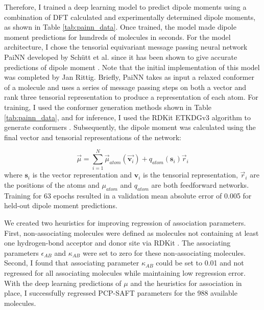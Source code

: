 Therefore, I trained a deep learning model to predict dipole moments using a combination of DFT calculated and experimentally determined dipole moments, as shown in Table \ref{tab:painn_data}.  Once trained, the model made dipole moment predictions for hundreds of molecules in seconds. For the model architecture, I chose the tensorial equivariant message passing neural network PaiNN developed by Schütt et al. since it has been shown to give accurate predictions of dipole moment \cite{Schutt2021}. Note that the initial implementation of this model was completed by Jan Rittig. Briefly, PaiNN takes as input a relaxed conformer of a molecule and uses a series of message passing steps on both a vector and rank three tensorial representation to produce a representation of each atom. For training, I used the conformer generation methods shown in Table \ref{tab:painn_data}, and for inference, I used the RDKit ETKDGv3 algorithm to generate conformers \cite{Wang2020}. Subsequently, the dipole moment was calculated using the final vector and tensorial representations of the network:

\begin{equation}
    \vec \mu = \sum_{i=1}^N \vec \mu_{atom}(\vec{\mathbf v_i}) + q_{atom}(\mathbf s_i)\vec r_i
\end{equation}
where $\mathbf s_i$ is the vector representation and $\mathbf v_i$ is the tensorial representation, $\vec r_i$ are the positions of the atoms and $\mu_{atom}$ and $q_{atom}$ are both feedforward networks. Training for 63 epochs resulted in a validation mean absolute error of 0.005 for held-out dipole moment predictions.

We created two heuristics for improving regression of association parameters. First, non-associating molecules were defined as molecules not containing at least one hydrogen-bond acceptor and donor site via RDKit \cite{rdkit}. The associating parameters $\epsilon_{AB}$ and $\kappa_{AB}$ were set to zero for these non-associating molecules. Second, I found that associating parameter $\kappa_{AB}$ could be set to 0.01 and not regressed for all associating molecules while maintaining low regression error. With the deep learning predictions of $\mu$ and the heuristics for association in place, I successfully regressed PCP-SAFT parameters for the 988 available molecules. 

